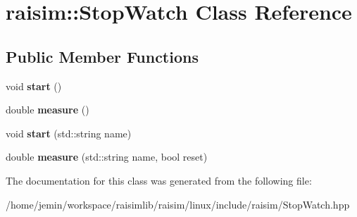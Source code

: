 \hypertarget{classraisim_1_1StopWatch}{}\section{raisim\+:\+:Stop\+Watch Class Reference}
\label{classraisim_1_1StopWatch}
\subsection*{Public Member Functions}
\begin{DoxyCompactItemize}
\item 
\mbox{\label{classraisim_1_1StopWatch_ac4430fbd9c3f14b43515a3f792f1694e}} 
void {\bfseries start} ()
\item 
\mbox{\label{classraisim_1_1StopWatch_a1b322526cd9f90294887862a328369f6}} 
double {\bfseries measure} ()
\item 
\mbox{\label{classraisim_1_1StopWatch_a2a7c3fd2892eea2e9c3dd5cd986b4260}} 
void {\bfseries start} (std\+::string name)
\item 
\mbox{\label{classraisim_1_1StopWatch_aca84b220eedd8d8616d89a954b308ed5}} 
double {\bfseries measure} (std\+::string name, bool reset)
\end{DoxyCompactItemize}


The documentation for this class was generated from the following file\+:\begin{DoxyCompactItemize}
\item 
/home/jemin/workspace/raisimlib/raisim/linux/include/raisim/Stop\+Watch.\+hpp\end{DoxyCompactItemize}

